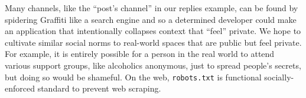 Many channels, like the ``post's channel'' in our replies example,
can be found by spidering Graffiti like a search engine and so a determined
developer could make an application that intentionally collapses context
that ``feel'' private.
We hope to cultivate similar social norms to real-world spaces that
are public but feel private.
For example, it is entirely possible for a person in the real world
to attend various support groups, like alcoholics anonymous,
just to spread people's secrets, but doing so would be shameful.
On the web, \texttt{robots.txt} is functional socially-enforced standard
to prevent web scraping.







